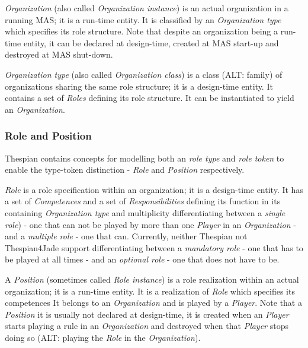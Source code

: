 \textit{Organization} (also called \textit{Organization instance}) is an actual organization in a running MAS; it is a run-time entity.
It is classified by an \textit{Organization type} which specifies its role structure.
Note that despite an organization being a run-time entity, it can be declared at design-time, created at MAS start-up and destroyed at MAS shut-down.

\textit{Organization type} (also called \textit{Organization class}) is a class (ALT: family) of organizations sharing the same role structure; it is a design-time entity.
It contains a set of \textit{Roles} defining its role structure.
It can be instantiated to yield an \textit{Organization}. 

\subsubsection*{Role and Position}

Thespian contains concepts for modelling both an \textit{role type} and \textit{role token} to enable the type-token distinction - \textit{Role} and \textit{Position} respectively.

\textit{Role} is a role specification within an organization; it is a design-time entity.
It has a set of \textit{Competences} and a set of \textit{Responsibilities} defining its function in its containing \textit{Organization type} and multiplicity differentiating between a \textit{single role}) - one that can not be played by more than one \textit{Player} in an \textit{Organization} - and a \textit{multiple role} - one that can.
Currently, neither Thespian not Thespian4Jade support differentiating between a \textit{mandatory role} - one that has to be played at all times - and an \textit{optional role} - one that does not have to be.

A \textit{Position} (sometimes called \textit{Role instance}) is a role realization within an actual organization; it is a run-time entity.
It is a realization of \textit{Role} which specifies its competences
It belongs to an \textit{Organization} and is played by a \textit{Player}.
Note that a \textit{Position} it is usually not declared at design-time, it is created when an \textit{Player} starts playing a rule in an \textit{Organization} and destroyed when that \textit{Player} stops doing so (ALT: playing the \textit{Role} in the \textit{Organization}).

